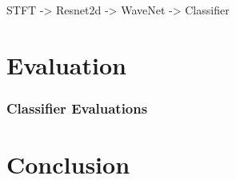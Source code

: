 \documentclass[]{report}
\begin{document}
STFT -\textgreater{} Resnet2d -\textgreater{} WaveNet -\textgreater{}
Classifier

\hypertarget{evaluation}{%
\chapter{Evaluation}\label{evaluation}}

\hypertarget{classifier-evaluations}{%
\subsection{Classifier Evaluations}\label{classifier-evaluations}}

\begin{figure}[h]
\end{figure}

\hypertarget{section}{%
\subsection{}\label{section}}

\hypertarget{conclusion}{%
\chapter{Conclusion}\label{conclusion}}
\end{document}
